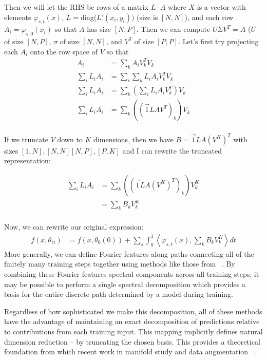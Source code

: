 Then we will let the RHS be rows of a matrix $L \cdot A$ where $X$ is a vector with elements $\varphi_{s,t}(x)$, $L =
$diag($L'(x_i, y_i))$ (size is $[N, N]$), and each row $A_i
= \varphi_{s,0}(x_i)$ so that $A$ has size $[N, P]$. Then we can compute $U\Sigma V^T =
A$ ($U$ of size $[N, P]$, $\sigma$ of size $[N, N]$, and $V^T$ of size $[P, P]$. Let's first try projecting each $A_i$ onto the row space of $V$ so that 
\begin{align}
    A_i &= \sum_k A_i V_k^T V_k \\
    \sum_i L_i A_i &= \sum_i \sum_k L_i A_i V_k^T V_k\\
    \sum_i L_i A_i &= \sum_k \left(\sum_i L_i A_i V_k^T\right) V_k\\
    \sum_i L_i A_i &= \sum_k \left((\vec 1 L A V^T)_k\right) V_k\\
\end{align}

If we truncate  $V$ down to $K$ dimensions, then we have $B = \vec 1 L A (V^K)^T$ with sizes $[1,N], [N,N][N,P],[P,K]$ and I can rewrite the truncated representation:

\begin{align}
    \sum_i L_i A_i &= \sum_k \left((\vec 1 L A (V^K)^T)_k\right) V^K_k\\
    &= \sum_k B_k V^K_k\\
\end{align}

Now, we can rewrite our original expression:
\begin{align}
     f(x, \theta_\text{tr}) &= f(x, \theta_0(0)) +  \sum_s
\int_0^1                                  \left\langle 
                                   \varphi_{s,t}(x) ,  \sum_k B_k V^K_k \right \rangle dt
 \end{align}
More
generally, we can define Fourier features along paths connecting all of the finitely many training steps together using methods like those from ~\citet{tancik2020fourierfeatures}. By combining these Fourier features spectral components across all training steps, it may be possible to perform a single spectral decomposition which provides a basis for the entire discrete path determined by a model during training. 

Regardless of how sophisticated we make this decomposition, all of
these methods have the advantage of maintaining an exact decomposition of predictions relative to contributions from each training input. This mapping implicitly
defines natural dimension reduction -- by truncating the chosen
basis. This provides a theoretical foundation
from which recent work in manifold study and data augmentation
~\citep{kaufman_data_2023, liu_linear_2023, sipka_differentiable_2023,
  cha_orthogonality-enforced_2023, marbut_reliable_2023,
  gao_out--domain_2023, oh_provable_2023, chen2023aware}.


